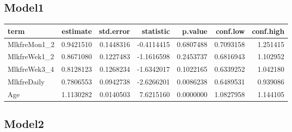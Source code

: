 \documentclass[]{article}
\newenvironment{Shaded}{\begin{snugshade}}{\end{snugshade}}
\newcommand{\DataTypeTok}[1]{\textcolor[rgb]{0.13,0.29,0.53}{#1}}
\newcommand{\KeywordTok}[1]{\textcolor[rgb]{0.13,0.29,0.53}{\textbf{#1}}}
\newcommand{\NormalTok}[1]{#1}
\newcommand{\OperatorTok}[1]{\textcolor[rgb]{0.81,0.36,0.00}{\textbf{#1}}}
\newcommand{\OtherTok}[1]{\textcolor[rgb]{0.56,0.35,0.01}{#1}}
\newcommand{\StringTok}[1]{\textcolor[rgb]{0.31,0.60,0.02}{#1}}
\begin{document}
\hypertarget{model1-6}{%
\subsection{Model1}\label{model1-6}}

\begin{Shaded}
\end{Shaded}

\begin{longtable}[]{@{}lrrrrrr@{}}
\toprule
term & estimate & std.error & statistic & p.value & conf.low &
conf.high\tabularnewline
\midrule
\endhead
MlkfreMon1\_2 & 0.9421510 & 0.1448316 & -0.4114415 & 0.6807488 &
0.7093158 & 1.251415\tabularnewline
MlkfreWek1\_2 & 0.8671080 & 0.1227483 & -1.1616598 & 0.2453737 &
0.6816943 & 1.102952\tabularnewline
MlkfreWek3\_4 & 0.8128123 & 0.1268234 & -1.6342017 & 0.1022165 &
0.6339252 & 1.042180\tabularnewline
MlkfreDaily & 0.7806553 & 0.0942738 & -2.6266201 & 0.0086238 & 0.6489531
& 0.939086\tabularnewline
Age & 1.1130282 & 0.0140503 & 7.6215160 & 0.0000000 & 1.0827958 &
1.144105\tabularnewline
\bottomrule
\end{longtable}

\hypertarget{model2-6}{%
\subsection{Model2}\label{model2-6}}
\end{document}
